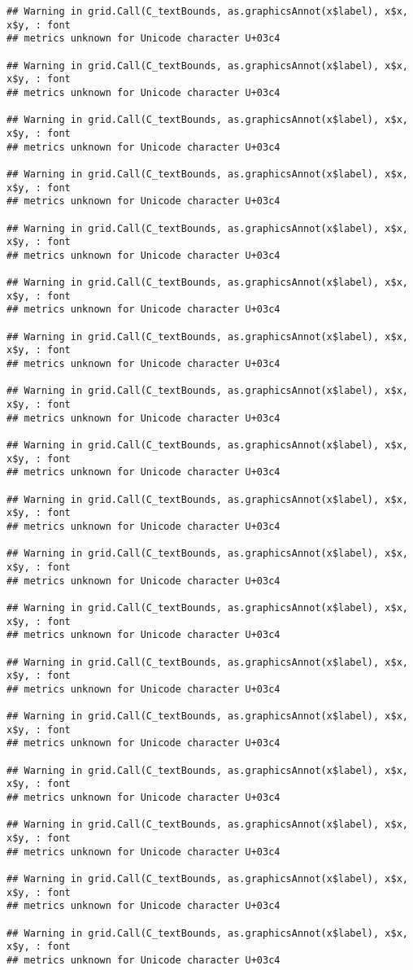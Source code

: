 \documentclass[
]{article}
\begin{document}
\begin{verbatim}
## Warning in grid.Call(C_textBounds, as.graphicsAnnot(x$label), x$x, x$y, : font
## metrics unknown for Unicode character U+03c4

## Warning in grid.Call(C_textBounds, as.graphicsAnnot(x$label), x$x, x$y, : font
## metrics unknown for Unicode character U+03c4

## Warning in grid.Call(C_textBounds, as.graphicsAnnot(x$label), x$x, x$y, : font
## metrics unknown for Unicode character U+03c4

## Warning in grid.Call(C_textBounds, as.graphicsAnnot(x$label), x$x, x$y, : font
## metrics unknown for Unicode character U+03c4

## Warning in grid.Call(C_textBounds, as.graphicsAnnot(x$label), x$x, x$y, : font
## metrics unknown for Unicode character U+03c4

## Warning in grid.Call(C_textBounds, as.graphicsAnnot(x$label), x$x, x$y, : font
## metrics unknown for Unicode character U+03c4

## Warning in grid.Call(C_textBounds, as.graphicsAnnot(x$label), x$x, x$y, : font
## metrics unknown for Unicode character U+03c4

## Warning in grid.Call(C_textBounds, as.graphicsAnnot(x$label), x$x, x$y, : font
## metrics unknown for Unicode character U+03c4

## Warning in grid.Call(C_textBounds, as.graphicsAnnot(x$label), x$x, x$y, : font
## metrics unknown for Unicode character U+03c4

## Warning in grid.Call(C_textBounds, as.graphicsAnnot(x$label), x$x, x$y, : font
## metrics unknown for Unicode character U+03c4

## Warning in grid.Call(C_textBounds, as.graphicsAnnot(x$label), x$x, x$y, : font
## metrics unknown for Unicode character U+03c4

## Warning in grid.Call(C_textBounds, as.graphicsAnnot(x$label), x$x, x$y, : font
## metrics unknown for Unicode character U+03c4

## Warning in grid.Call(C_textBounds, as.graphicsAnnot(x$label), x$x, x$y, : font
## metrics unknown for Unicode character U+03c4

## Warning in grid.Call(C_textBounds, as.graphicsAnnot(x$label), x$x, x$y, : font
## metrics unknown for Unicode character U+03c4

## Warning in grid.Call(C_textBounds, as.graphicsAnnot(x$label), x$x, x$y, : font
## metrics unknown for Unicode character U+03c4

## Warning in grid.Call(C_textBounds, as.graphicsAnnot(x$label), x$x, x$y, : font
## metrics unknown for Unicode character U+03c4

## Warning in grid.Call(C_textBounds, as.graphicsAnnot(x$label), x$x, x$y, : font
## metrics unknown for Unicode character U+03c4

## Warning in grid.Call(C_textBounds, as.graphicsAnnot(x$label), x$x, x$y, : font
## metrics unknown for Unicode character U+03c4
\end{verbatim}
\end{document}
